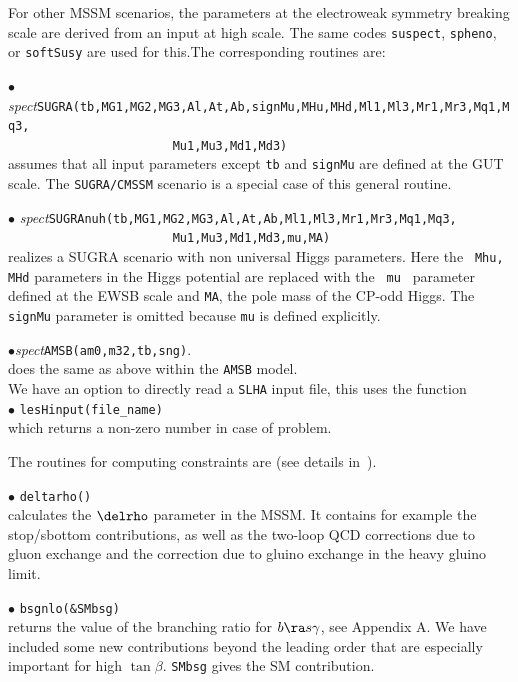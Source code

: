 \documentclass[12pt,a4paper]{article}
\begin{document}
For other MSSM scenarios, the   parameters at the electroweak symmetry breaking scale are derived from 
an  input at high scale. The same codes {\tt suspect}, 
{\tt spheno}, or {\tt softSusy} are used for this.The corresponding
routines are:

\noindent $\bullet$ {\it
spect}\verb|SUGRA(tb,MG1,MG2,MG3,Al,At,Ab,signMu,MHu,MHd,Ml1,Ml3,Mr1,Mr3,Mq1,Mq3,|\\
\verb|                       Mu1,Mu3,Md1,Md3)|\\
assumes that  all input parameters except {\tt tb} and {\tt signMu}  are
defined at the GUT scale. The {\tt SUGRA/CMSSM} scenario is a special case of this general routine. 

\noindent $\bullet$ {\it
spect}\verb|SUGRAnuh(tb,MG1,MG2,MG3,Al,At,Ab,Ml1,Ml3,Mr1,Mr3,Mq1,Mq3,|\\
\verb|                       Mu1,Mu3,Md1,Md3,mu,MA)|\\
realizes a SUGRA scenario with non universal Higgs parameters. Here the {\tt
Mhu, MHd} parameters in the Higgs potential are replaced with the {\tt
mu } parameter defined at the  EWSB scale and {\tt MA}, the pole mass of the CP-odd Higgs. The
{\tt signMu} parameter is omitted  because {\tt mu} is defined
explicitly.

\noindent
$\bullet${\it spect}\verb|AMSB(am0,m32,tb,sng)|.\\
does  the same as above within the {\tt AMSB} model.\\

We  have an option to directly read a {\tt SLHA}  input file, this uses the  function \\
\noi$\bullet$ \verb|lesHinput(file_name) |\\
which returns a non-zero number in case of problem.

The routines for computing constraints are (see details
in~\cite{Belanger:2004yn}).

\noi$\bullet$ \verb|deltarho()|\\
 calculates  the $\delrho$ parameter in the MSSM.  It contains for example the 
stop/sbottom contributions, as well as the two-loop QCD
corrections due to gluon exchange and the correction due to gluino
exchange in the heavy gluino limit.

\noi$\bullet$ \verb|bsgnlo(&SMbsg)|\\ returns the value of the branching ratio for  $b\ra s\gamma$, see Appendix A. 
We have included some new contributions beyond the leading order that are
especially important for high $\tan\beta$. \verb|SMbsg| gives the SM contribution.
\end{document}
